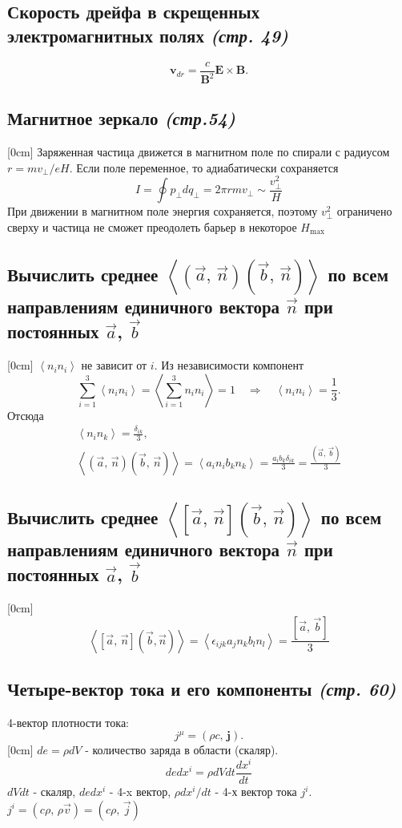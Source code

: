 \documentclass[a4paper,12pt]{article}
\begin{document}
\subsection{Скорость дрейфа в скрещенных электромагнитных полях \emph{(стр. 49)}}
\[
	\mathbf{v}_{dr}=\frac{c}{\mathbf{B}^2}\mathbf{E}\times\mathbf{B}
.\] 
\subsection{Магнитное зеркало \emph{(стр.54)}}
[0cm]
Заряженная частица движется в магнитном поле по спирали с радиусом
$r=mv_{\bot}/eH$. Если поле переменное, то адиабатически сохраняется 
\[I=\oint p_{\bot} dq_{\bot}=2\pi r m v_{\bot}\sim \frac{v_{\bot}^2}{H}\]
При движении в магнитном поле энергия сохраняется, поэтому $v_{\bot}^2$
ограничено сверху и частица не сможет преодолеть барьер в некоторое $H_{\max}$
\subsection{Вычислить среднее $\left<\left(\vec{a},\,\vec{n}\right)
\left( \vec{b},\,\vec{n} \right) \right>$ по всем направлениям единичного
вектора $\vec{n}$ при постоянных  $\vec{a}$, $\vec{b}$}
[0cm]
$\left< n_i n_i\right>$ не зависит от $i$. Из независимости компонент 
\[
\sum_{i=1}^3\left< n_i n_i\right>=\left<\sum_{i=1}^3 n_i n_i\right>=1
\quad \Rightarrow \quad \left< n_i n_i\right>=\frac{1}{3}.
\]
Отсюда 
\begin{gather*}
	\left< n_i n_k\right>=\frac{\delta_{ik}}{3},\\
	\left<\left(\vec{a},\,\vec{n}\right)
\left(\vec{b}
,\,\vec{n}\right)\right>=\left< a_i n_i b_k n_k\right>=\frac{a_i b_k \delta_{ik}}{3}=
\frac{\left(\vec{a},\,\vec{b}\right)}{3}
\end{gather*}
\subsection{Вычислить среднее $\left<\left[\vec{a},\,\vec{n}\right]
\left( \vec{b},\,\vec{n} \right) \right>$ по всем направлениям единичного
вектора $\vec{n}$ при постоянных  $\vec{a}$, $\vec{b}$}
[0cm]
\[
	\left<[\vec{a},\,\vec{n}]\left(\vec{b},\vec{n}\right)\right>=\left<
	\epsilon_{ijk}
	a_j n_k b_l n_l\right>=\frac{\left[\vec{a},\,\vec{b}\right]}{3}
\]
\subsection{Четыре-вектор тока и его компоненты \emph{(стр. 60)}}
4-вектор плотности тока:
\[
	j^\mu=(\rho c,\,\mathbf{j})
.\] 
[0cm]
$de=\rho dV$ - количество заряда в области (скаляр).
\[
de dx^i=\rho dV dt \frac{dx^i}{dt}
\]
$dV dt$ - скаляр, $de dx^i$ - 4-x вектор, $\rho dx^i/dt$ - 4-х вектор тока $j^i$.
$j^i=\left(c\rho,\,\rho\vec{v}\right)=\left(c\rho,\,\vec{j}\right)$
\end{document}
